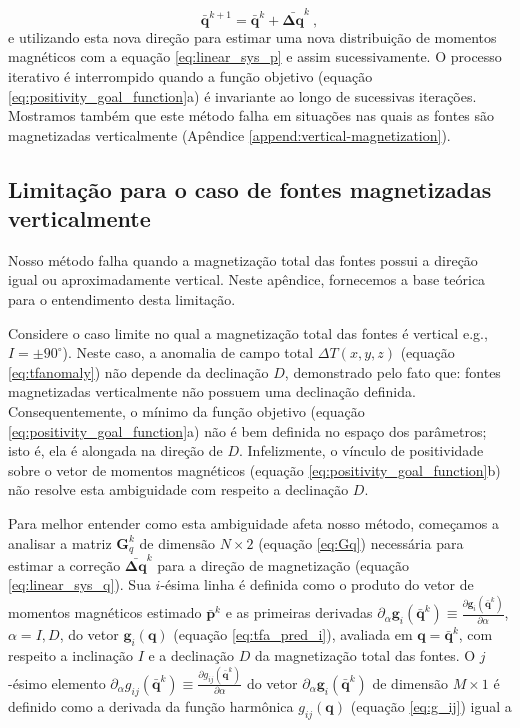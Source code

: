 \begin{equation}
\bar{\mathbf{q}}^{k+1} = \bar{\mathbf{q}}^{k} + \bar{\mathbf{\Delta q}}^{k} \: ,
\label{eq:q_next}
\end{equation}
e utilizando esta nova direção para estimar uma nova distribuição de momentos magnéticos com a equação \ref{eq:linear_sys_p} e assim sucessivamente. O processo iterativo é interrompido quando a função objetivo (equação \ref{eq:positivity_goal_function}a) é invariante ao longo de sucessivas iterações. Mostramos também que este método falha em situações nas quais as fontes são magnetizadas verticalmente (Apêndice \ref{append:vertical-magnetization}).

\subsection{Limitação para o caso de fontes magnetizadas verticalmente}
\label{subsec:vertical-magnetization}

Nosso método falha quando a magnetização total das fontes possui a direção igual ou aproximadamente vertical. Neste apêndice, fornecemos a base teórica para o entendimento desta limitação. 

Considere o caso limite no qual a magnetização total das fontes é vertical e.g., $I = \pm 90^\circ$). Neste caso, a anomalia de campo total $\Delta T(x, y, z)$ (equação \ref{eq:tfanomaly}) não depende da declinação $D$, demonstrado pelo fato que: fontes magnetizadas verticalmente não possuem uma declinação definida. Consequentemente, o mínimo da função objetivo (equação \ref{eq:positivity_goal_function}a) não é bem definida no espaço dos parâmetros; isto é, ela é alongada na direção de $D$. Infelizmente, o vínculo de positividade sobre o vetor de momentos magnéticos (equação  \ref{eq:positivity_goal_function}b) não resolve esta ambiguidade com respeito a declinação $D$. 

Para melhor entender como esta ambiguidade afeta nosso método, começamos a analisar a matriz $\mathbf{G}_{q}^{k}$ de dimensão $N \times 2$ (equação \ref{eq:Gq}) necessária para estimar a correção $\bar{\mathbf{\Delta q}}^{k}$ para a direção de magnetização (equação \ref{eq:linear_sys_q}). Sua $i$-ésima linha é definida como o produto do vetor de momentos magnéticos estimado $\bar{\mathbf{p}}^{k}$ e as primeiras derivadas $\partial_{\alpha} \mathbf{g}_{i}(\bar{\mathbf{q}}^{k}) \equiv 
\frac{\partial \mathbf{g}_{i}(\bar{\mathbf{q}}^{k})}{\partial \alpha}$, $\alpha= I, D$, do vetor $\mathbf{g}_{i}(\mathbf{q})$ (equação \ref{eq:tfa_pred_i}), avaliada em $\mathbf{q} = \bar{\mathbf{q}}^{k}$, com respeito a inclinação $I$ e a declinação $D$ da magnetização total das fontes. O $j$-ésimo elemento $\partial_{\alpha} g_{ij}(\bar{\mathbf{q}}^{k}) \equiv 
\frac{\partial g_{ij}(\bar{\mathbf{q}}^{k})}{\partial \alpha}$ do vetor $\partial_{\alpha} \mathbf{g}_{i}(\bar{\mathbf{q}}^{k})$ de dimensão $M \times 1$ é definido como a derivada da função harmônica $g_{ij}(\mathbf{q})$ (equação \ref{eq:g_ij}) igual a 

